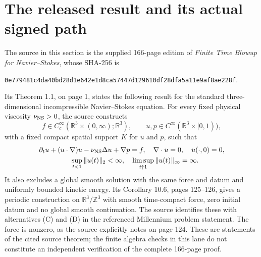 \section{The released result and its actual signed path}
\label{nsprop:source}
The source in this section is the supplied 166-page edition of
\emph{Finite Time Blowup for Navier--Stokes}, whose SHA-256 is
\begin{center}\footnotesize
\texttt{0e779481c4da40bd28d1e642e1d8ca57447d129610df28dfa5a11e9af8ae228f}.
\end{center}
Its Theorem 1.1, on page 1, states the following result for the standard
three-dimensional incompressible Navier--Stokes equation. For every
fixed physical viscosity $\nu_{\rm NS}>0$, the source constructs
\[
 f\in C^\infty_c(\mathbb R^3\times(0,\infty);\mathbb R^3),
 \qquad u,p\in C^\infty(\mathbb R^3\times[0,1)),
\]
with a fixed compact spatial support $K$ for $u$ and $p$, such that
\begin{equation}
 \begin{gathered}
 \partial_tu+(u\cdot\nabla)u-\nu_{\rm NS}\Delta u+\nabla p=f,
 \quad \nabla\cdot u=0,\quad u(\cdot,0)=0,\\
 \quad \sup_{t<1}\|u(t)\|_2<\infty,\quad
 \limsup_{t\uparrow1}\|u(t)\|_\infty=\infty .
 \end{gathered}
 \label{nsprop:source_theorem}
\end{equation}
It also excludes a global smooth solution with the same force and datum
and uniformly bounded kinetic energy. Its Corollary 10.6, pages 125--126,
gives a periodic construction on $\mathbb R^3/\mathbb Z^3$ with smooth
time-compact force, zero initial datum and no global smooth continuation.
The source identifies these with alternatives (C) and (D) in the
referenced Millennium problem statement. The force is nonzero, as the
source explicitly notes on page 124. These are statements of the cited
source theorem; the finite algebra checks in this lane do not constitute
an independent verification of the complete 166-page proof.

